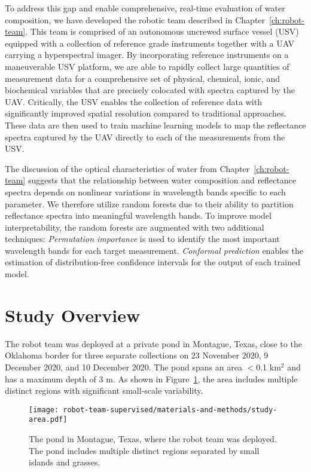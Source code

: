 To address this gap and enable comprehensive, real-time evaluation of water
composition, we have developed the robotic team described in
Chapter~\ref{ch:robot-team}. This team is comprised of an autonomous
uncrewed surface vessel (USV) equipped with a collection of reference grade
instruments together with a UAV carrying a hyperspectral imager. By
incorporating reference instruments on a maneuverable USV platform, we are able
to rapidly collect large quantities of measurement data for a comprehensive set
of physical, chemical, ionic, and biochemical variables that are precisely
colocated with spectra captured by the UAV. Critically, the USV enables the
collection of reference data with significantly improved spatial resolution
compared to traditional approaches. These data are then used to train machine
learning models to map the reflectance spectra captured by the UAV directly to
each of the measurements from the USV.

The discussion of the optical characteristics of water from
Chapter~\ref{ch:robot-team} suggests that the relationship between water
composition and reflectance spectra depends on nonlinear variations in
wavelength bands specific to each parameter. We therefore utilize random
forests due to their ability to partition reflectance spectra into meaningful
wavelength bands. To improve model interpretability, the random forests are
augmented with two additional techniques: \textit{Permutation importance} is
used to identify the most important wavelength bands for each target
measurement. \textit{Conformal prediction} enables the estimation of
distribution-free confidence intervals for the output of each trained model.

\section{Study Overview}

The robot team was deployed at a private pond in Montague, Texas, close to the
Oklahoma border for three separate collections on 23 November 2020, 9 December
2020, and 10 December 2020. The pond spans an area $<$0.1 km$^{2}$ and has a
maximum depth of 3 m. As shown in Figure~\ref{fig:study-area}, the area includes
multiple distinct regions with significant small-scale variability.

\begin{figure}[H]
  \centering
  \texttt{[image: robot-team-supervised/materials-and-methods/study-area.pdf]}
  \caption{The pond in Montague, Texas, where the robot team was deployed. The
    pond includes multiple distinct regions separated by small islands and
    grasses. \label{fig:study-area}}
\end{figure}

